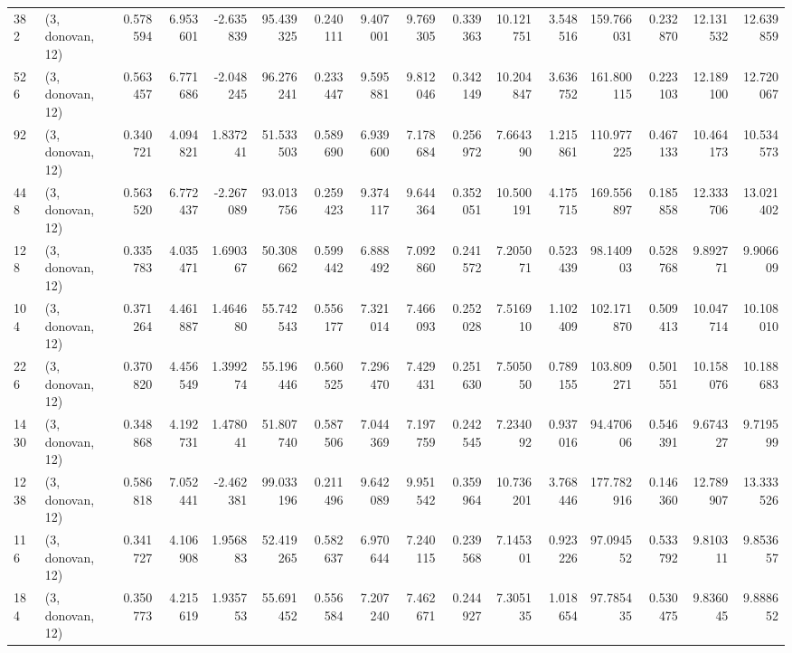 \begin{tabular}{llrrrrrrrrrrrrrr}
382  &  (3, donovan, 12) &   0.578594 &   6.953601 &  -2.635839 &     95.439325 &    0.240111 &    9.407001 &    9.769305 &  0.339363 &  10.121751 &   3.548516 &   159.766031 &   0.232870 &  12.131532 &  12.639859 \\
526  &  (3, donovan, 12) &   0.563457 &   6.771686 &  -2.048245 &     96.276241 &    0.233447 &    9.595881 &    9.812046 &  0.342149 &  10.204847 &   3.636752 &   161.800115 &   0.223103 &  12.189100 &  12.720067 \\
92   &  (3, donovan, 12) &   0.340721 &   4.094821 &   1.837241 &     51.533503 &    0.589690 &    6.939600 &    7.178684 &  0.256972 &   7.664390 &   1.215861 &   110.977225 &   0.467133 &  10.464173 &  10.534573 \\
448  &  (3, donovan, 12) &   0.563520 &   6.772437 &  -2.267089 &     93.013756 &    0.259423 &    9.374117 &    9.644364 &  0.352051 &  10.500191 &   4.175715 &   169.556897 &   0.185858 &  12.333706 &  13.021402 \\
128  &  (3, donovan, 12) &   0.335783 &   4.035471 &   1.690367 &     50.308662 &    0.599442 &    6.888492 &    7.092860 &  0.241572 &   7.205071 &   0.523439 &    98.140903 &   0.528768 &   9.892771 &   9.906609 \\
104  &  (3, donovan, 12) &   0.371264 &   4.461887 &   1.464680 &     55.742543 &    0.556177 &    7.321014 &    7.466093 &  0.252028 &   7.516910 &   1.102409 &   102.171870 &   0.509413 &  10.047714 &  10.108010 \\
226  &  (3, donovan, 12) &   0.370820 &   4.456549 &   1.399274 &     55.196446 &    0.560525 &    7.296470 &    7.429431 &  0.251630 &   7.505050 &   0.789155 &   103.809271 &   0.501551 &  10.158076 &  10.188683 \\
1430 &  (3, donovan, 12) &   0.348868 &   4.192731 &   1.478041 &     51.807740 &    0.587506 &    7.044369 &    7.197759 &  0.242545 &   7.234092 &   0.937016 &    94.470606 &   0.546391 &   9.674327 &   9.719599 \\
1238 &  (3, donovan, 12) &   0.586818 &   7.052441 &  -2.462381 &     99.033196 &    0.211496 &    9.642089 &    9.951542 &  0.359964 &  10.736201 &   3.768446 &   177.782916 &   0.146360 &  12.789907 &  13.333526 \\
116  &  (3, donovan, 12) &   0.341727 &   4.106908 &   1.956883 &     52.419265 &    0.582637 &    6.970644 &    7.240115 &  0.239568 &   7.145301 &   0.923226 &    97.094552 &   0.533792 &   9.810311 &   9.853657 \\
184  &  (3, donovan, 12) &   0.350773 &   4.215619 &   1.935753 &     55.691452 &    0.556584 &    7.207240 &    7.462671 &  0.244927 &   7.305135 &   1.018654 &    97.785435 &   0.530475 &   9.836045 &   9.888652 \\

\end{tabular}
